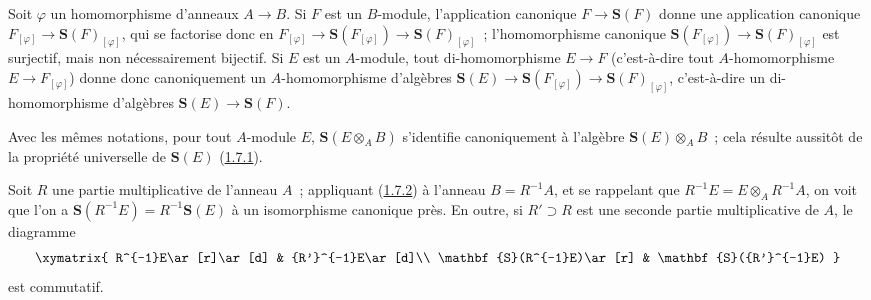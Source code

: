 \begin{env}[1.7.2]
\label{II.1.7.2-fr}
Soit $\varphi$ un homomorphisme d'anneaux $A\to B$. Si $F$ est un $B$-module,
l'application canonique $F\to\mathbf{S}(F)$ donne une application canonique
$F_{[\varphi]}\to\mathbf{S}(F)_{[\varphi]}$, qui se factorise donc en
$F_{[\varphi]}\to\mathbf{S}(F_{[\varphi]})\to
\mathbf{S}(F)_{[\varphi]}$~; l'homomorphisme canonique
$\mathbf{S}(F_{[\varphi]})\to\mathbf{S}(F)_{[\varphi]}$ est surjectif, mais
non nécessairement bijectif. Si $E$ est un $A$-module, tout di-homomorphisme
$E\to F$ (c'est-à-dire tout $A$-homomorphisme $E\to F_{[\varphi]}$) donne donc
canoniquement un $A$-homomorphisme d'algèbres
$\mathbf{S}(E)\to\mathbf{S}(F_{[\varphi]})\to
\mathbf{S}(F)_{[\varphi]}$, c'est-à-dire un di-homomorphisme d'algèbres
$\mathbf{S}(E)\to\mathbf{S}(F)$.

Avec les mêmes notations, pour tout $A$-module $E$,
$\mathbf{S}(E\otimes_A B)$ s'identifie canoniquement à l'algèbre
$\mathbf{S}(E)\otimes_A B$~; cela résulte aussitôt de la propriété universelle
de $\mathbf{S}(E)$ (\hyperref[II.1.7.1-fr]{1.7.1}).
\end{env}

\begin{env}[1.7.3]
\label{II.1.7.3-fr}
Soit $R$ une partie multiplicative de l'anneau $A$~; appliquant
(\hyperref[II.1.7.2-fr]{1.7.2}) à l'anneau $B=R^{-1}A$, et se rappelant que
$R^{-1}E=E\otimes_A R^{-1}A$, on voit que l'on a
$\mathbf{S}(R^{-1}E)=R^{-1}\mathbf{S}(E)$ à un isomorphisme canonique près.
En outre, si $R'\supset R$ est une seconde partie multiplicative de $A$, le
diagramme
\[
  \xymatrix{
    R^{-1}E\ar[r]\ar[d] & {R'}^{-1}E\ar[d]\\
    \mathbf{S}(R^{-1}E)\ar[r] & \mathbf{S}({R'}^{-1}E)
  }
\]
est commutatif.
\end{env}

